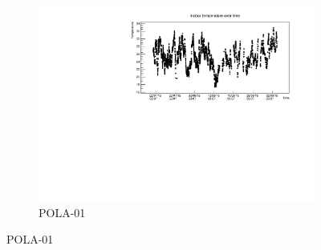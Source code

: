\documentclass[12pt,a4paper]{amsart}
\begin{document}
\begin{figure}
\centering
	\begin{subfigure}[b]{\textwidth}
	\centering
		\includegraphics[width=\textwidth]{../data/plots/POLA-01/IndoorTemp_POLA-01.pdf}
		\caption{POLA-01}
		\label{fig:indoortemp_POLA-01}
	\end{subfigure}
	

\end{figure}
\end{document}
